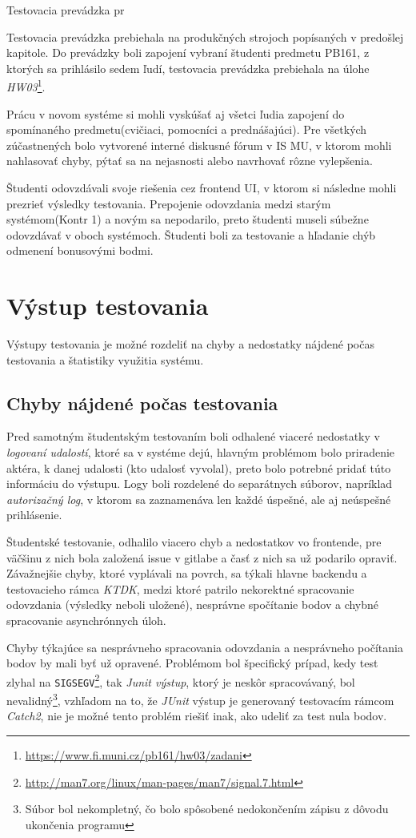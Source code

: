 \documentclass[
  digital, %
  twoside, %
  table,   %
  lof,     %
  lot,     %
]{fithesis3}
\begin{document}
Testovacia prevádzka pr

Testovacia prevádzka prebiehala na produkčných strojoch popísaných v predošlej kapitole. Do prevádzky boli zapojení vybraní študenti predmetu PB161, z ktorých sa prihlásilo sedem ľudí, testovacia prevádzka prebiehala na úlohe \emph{HW03}\footnote{\url{https://www.fi.muni.cz/pb161/hw03/zadani}}.

Prácu v novom systéme si mohli vyskúšať aj všetci ľudia zapojení do spomínaného predmetu(cvičiaci, pomocníci a prednášajúci). Pre všetkých zúčastnených bolo vytvorené interné diskusné fórum v IS MU, v ktorom mohli nahlasovať chyby, pýtať sa na nejasnosti alebo navrhovať rôzne vylepšenia. 

Študenti odovzdávali svoje riešenia cez frontend UI, v ktorom si následne mohli prezrieť výsledky testovania. Prepojenie odovzdania medzi starým systémom(Kontr 1) a novým sa nepodarilo, preto študenti museli súbežne odovzdávať v oboch systémoch.
Študenti boli za testovanie a hľadanie chýb odmenení bonusovými bodmi.

\section{Výstup testovania}
Výstupy testovania je možné rozdeliť na chyby a nedostatky nájdené počas testovania a štatistiky využitia systému.

\subsection{Chyby nájdené počas testovania}

Pred samotným študentským testovaním boli odhalené viaceré nedostatky v \emph{logovaní udalostí}, ktoré sa v systéme dejú, hlavným problémom bolo priradenie aktéra, k danej udalosti (kto udalosť vyvolal), preto bolo potrebné pridať túto informáciu do výstupu. Logy boli rozdelené do separátnych súborov, napríklad \emph{autorizačný log}, v ktorom sa zaznamenáva len každé úspešné, ale aj neúspešné prihlásenie.

Študentské testovanie, odhalilo viacero chyb a nedostatkov vo frontende, pre väčšinu z nich bola založená issue v gitlabe a časť z nich sa už podarilo opraviť.
Závažnejšie chyby, ktoré vyplávali na povrch, sa týkali hlavne backendu a testovacieho rámca \emph{KTDK}, medzi ktoré patrilo nekorektné spracovanie odovzdania (výsledky neboli uložené), nesprávne spočítanie bodov a chybné spracovanie asynchrónnych úloh.

Chyby týkajúce sa nesprávneho spracovania odovzdania a nesprávneho počítania bodov by mali byť už opravené. Problémom bol špecifický prípad, kedy test zlyhal na \texttt{SIGSEGV}\footnote{\url{http://man7.org/linux/man-pages/man7/signal.7.html}}, tak \emph{Junit výstup}, ktorý je neskôr spracovávaný, bol nevalidný\footnote{Súbor bol nekompletný, čo bolo spôsobené nedokončením zápisu z dôvodu ukončenia programu}, vzhľadom na to, že \emph{JUnit} výstup je generovaný testovacím rámcom \emph{Catch2}, nie je možné tento problém riešiť inak, ako udeliť za test nula bodov. 
\end{document}
